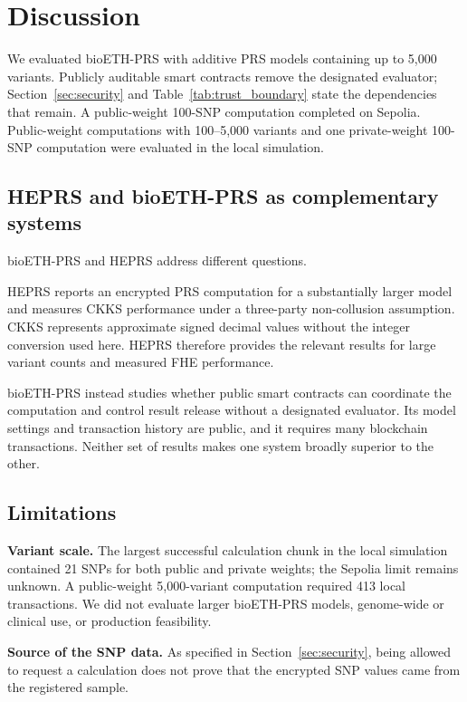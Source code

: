 \documentclass[10pt]{article}
\begin{document}
\section{Discussion}
\label{sec:discussion}

We evaluated bioETH-PRS with additive PRS models containing up to 5,000 variants.  Publicly
auditable smart contracts remove the designated evaluator; Section~\ref{sec:security} and
Table~\ref{tab:trust_boundary} state the dependencies that remain.
A public-weight 100-SNP computation completed on Sepolia.  Public-weight computations with
100--5,000 variants and one private-weight 100-SNP computation were evaluated in the local
simulation.

\subsection{HEPRS and bioETH-PRS as complementary systems}

bioETH-PRS and HEPRS \citep{knight2026heprs} address different questions.

HEPRS reports an encrypted PRS computation for a substantially larger model and measures
CKKS performance under a three-party non-collusion assumption.  CKKS represents
approximate signed decimal values without the integer conversion used here.  HEPRS
therefore provides the relevant results for large variant counts and measured FHE
performance.

bioETH-PRS instead studies whether public smart contracts can coordinate the computation
and control result release without a designated evaluator.  Its model settings and
transaction history are public, and it requires many blockchain transactions.  Neither
set of results makes one system broadly superior to the other.

\subsection{Limitations}

\textbf{Variant scale.}
The largest successful calculation chunk in the local simulation contained 21 SNPs for
both public and private weights; the Sepolia limit remains unknown.  A public-weight
5,000-variant computation required 413 local transactions.  We did not evaluate larger
bioETH-PRS models, genome-wide or clinical use, or production feasibility.

\textbf{Source of the SNP data.}
As specified in Section~\ref{sec:security}, being allowed to request a calculation does
not prove that the encrypted SNP values came from the registered sample.
\end{document}
